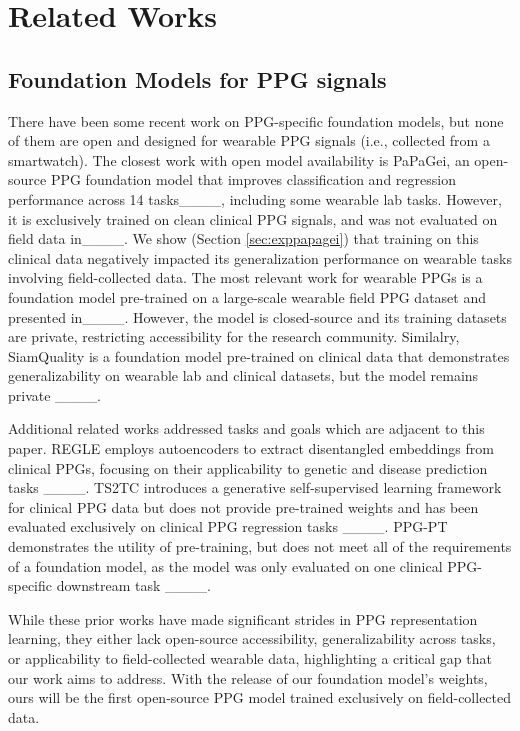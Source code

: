 \section{Related Works}
\subsection{Foundation Models for PPG signals}

There have been some recent work on PPG-specific foundation models, but none of them are open and designed for wearable PPG signals (i.e., collected from a smartwatch). The closest work with open model availability is PaPaGei, an open-source PPG foundation model that improves classification and regression performance across 14 tasks____, including some  wearable lab tasks. However, it is exclusively trained on clean clinical PPG signals, and was not evaluated on field data in____. We show (Section \ref{sec:exppapagei}) that training on this clinical data negatively impacted its generalization performance on wearable tasks involving field-collected data. The most relevant work for wearable PPGs is a foundation model pre-trained on a large-scale wearable field PPG dataset and presented in____. However, the model is closed-source and its training datasets are private, restricting accessibility for the research community. Similalry, SiamQuality is a foundation model pre-trained on clinical data that demonstrates  generalizability on wearable lab and clinical datasets, but the model remains private ____. 

Additional related works addressed tasks and goals which are adjacent to this paper. 
REGLE employs autoencoders to extract disentangled embeddings from clinical PPGs, focusing on their applicability to genetic and disease prediction tasks ____. TS2TC introduces a generative self-supervised learning framework for clinical PPG data but does not provide pre-trained weights and has been evaluated exclusively on clinical PPG regression tasks ____. PPG-PT demonstrates the utility of pre-training, but does not meet all of the requirements of a foundation model, %
as the model was only evaluated on one clinical PPG-specific downstream task ____.


While these prior works have made significant strides in PPG representation learning, they either lack open-source accessibility, generalizability across tasks, or applicability to field-collected wearable data, highlighting a critical gap that our work aims to address. With the release of our foundation model's weights, ours will be the first open-source PPG model trained exclusively on field-collected data.

